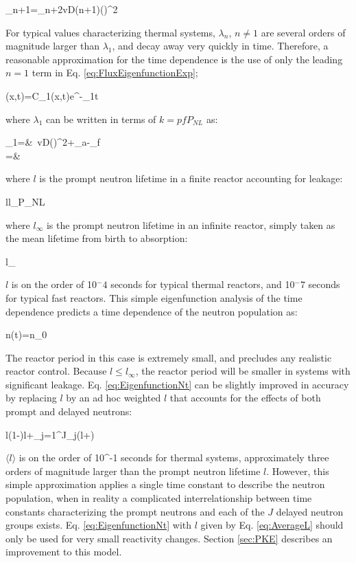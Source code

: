 \beq
\lambda_{n+1}=\lambda_n+2vD(n+1)\left(\right)^2
\eeq

For typical values characterizing thermal systems, \(\lambda_{n}\), \(n\neq1\) are several orders of magnitude larger than \(\lambda_1\), and decay away very quickly in time. Therefore, a reasonable approximation for the time dependence is the use of only the leading \(n=1\) term in Eq. \eqref{eq:FluxEigenfunctionExp};

\beq
\phi(x,t)=C_1(x,t)e^{-\lambda_1t}
\eeq

where \(\lambda_1\) can be written in terms of \(k=pfP_{NL}\) as:

\beqa
\lambda_1=&\ v\left\lbrack D\left(\right)^2+\Sigma_a-\nu\Sigma_f\right\rbrack\\
=&\ 
\eeqa

where \(l\) is the prompt neutron lifetime in a finite reactor accounting for leakage:

\beq
l\equiv l_\infty P_{NL}
\eeq

where \(l_\infty\) is the prompt neutron lifetime in an infinite reactor, simply taken as the mean lifetime from birth to absorption:

\beq
l_\infty\equiv{}
\eeq

\(l\) is on the order of 10$^-4$ seconds for typical thermal reactors, and 10$^-7$ seconds for typical fast reactors. This simple eigenfunction analysis of the time dependence predicts a time dependence of the neutron population as:

\beq
\label{eq:EigenfunctionNt}
n(t)=n_0
\eeq

The reactor period in this case is extremely small, and precludes any realistic reactor control. Because \(l\leq l_\infty\), the reactor period will be smaller in systems with significant leakage. Eq. \eqref{eq:EigenfunctionNt} can be slightly improved in accuracy by replacing \(l\) by an ad hoc weighted \(l\) that accounts for the effects of both prompt and delayed neutrons:

\beq
\label{eq:AverageL}
\langle l\rangle\equiv(1-\beta)l+\sum_{j=1}^J\beta_j\left(l+\right)
\eeq

\(\langle l\rangle\) is on the order of 10^{-1} seconds for thermal systems, approximately three orders of magnitude larger than the prompt neutron lifetime \(l\). However, this simple approximation applies a single time constant to describe the neutron population, when in reality a complicated interrelationship between time constants characterizing the prompt neutrons and each of the \(J\) delayed neutron groups exists. Eq. \eqref{eq:EigenfunctionNt} with \(l\) given by Eq. \eqref{eq:AverageL} should only be used for very small reactivity changes. Section \ref{sec:PKE} describes an improvement to this model.

